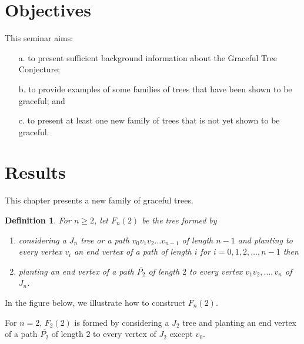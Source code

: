 \documentclass[a4paper, 11pt]{article}
\newtheorem{define}{Definition}
\begin{document}
\section{Objectives}

\noindent This seminar aims:
\begin{itemize}
	\item[a.] to present sufficient background information about the Graceful Tree Conjecture;
	\item[b.] to provide examples of some families of trees that have been shown to be graceful; and 
	\item[c.] to present at least one new family of trees that is not yet shown to be graceful.
\end{itemize}
\section{Results}
This chapter presents a new family of graceful trees. \bigskip
\begin{define}
	For $n\geq2$, let  $F_{n}\left ( 2 \right )$ be the tree formed by \begin{enumerate}
		\item considering a $J_{n}$ tree or a path $v_{0}v_{1}v_{2}\ldots v_{n-1}$ of length $n−1$ and planting to every vertex $v_{i}$ an end vertex of a path of length $i$ for	$i = 0,1,2,\ldots,n−1$ then
		\item planting an end vertex of a path $\overline{P_{2}}$ of length $2$ to every vertex $v_{1}v_{2},\ldots,v_{n}$ of $J_{n}$.
	\end{enumerate}
\end{define}

In the figure below, we illustrate how to construct  $F_{n}\left ( 2 \right )$. 

For $n=2$, $F_{2}\left ( 2 \right )$ is formed by considering a  $J_{2}$ tree and planting an end vertex of a path $\overline{P_{2}}$ of length $2$ to every vertex of $J_{2}$ except $v_{0}$.
\end{document}
